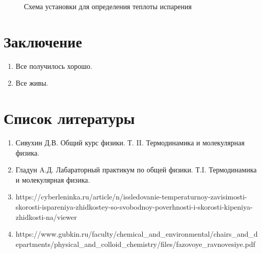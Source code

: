 \documentclass[a4paper,10pt]{article} %
\begin{document}
\begin{figure}[h]
	\caption{Схема установки для определения теплоты испарения}
\end{figure}

	


\section{Заключение}
	\begin{enumerate}
		\item Все получилось хорошо.
		\item Все живы.
	\end{enumerate}

\section{Список литературы}
	\begin{enumerate}
		\item Сивухин Д.В. Общий курс физики. Т. II. Термодинамика и молекулярная физика.
		\item Гладун A.Д. Лабараторный практикум по общей физики. Т.I. Термодинамика и молекулярная физика.
		\item https://cyberleninka.ru/article/n/issledovanie-temperaturnoy-zavisimosti-skorosti-ispareniya-zhidkostey-so-svobodnoy-poverhnosti-i-skorosti-kipeniya-zhidkosti-na/viewer
		\item https://www.gubkin.ru/faculty/chemical_and_environmental/chairs_and_departments/physical_and_colloid_chemistry/files/fazovoye_ravnovesiye.pdf
	\end{enumerate}
\end{document}

